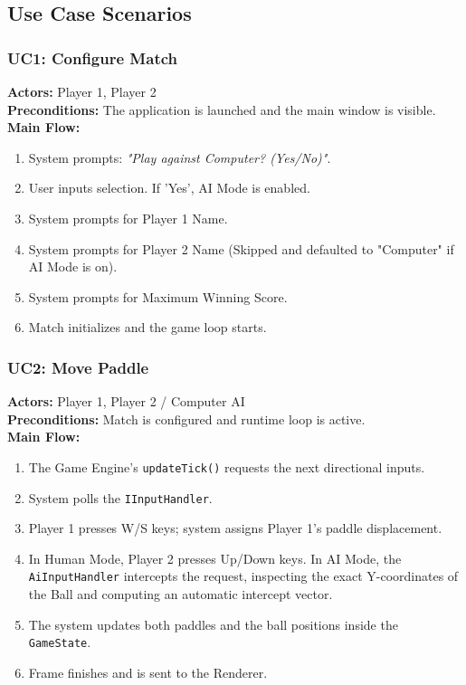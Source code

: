 \documentclass[12pt, a4paper]{article}
\begin{document}
\subsection{Use Case Scenarios}

\subsubsection*{UC1: Configure Match}
\textbf{Actors:} Player 1, Player 2 \\
\textbf{Preconditions:} The application is launched and the main window is visible. \\
\textbf{Main Flow:}
\begin{enumerate}
    \item System prompts: \textit{"Play against Computer? (Yes/No)"}.
    \item User inputs selection. If 'Yes', AI Mode is enabled.
    \item System prompts for Player 1 Name.
    \item System prompts for Player 2 Name (Skipped and defaulted to "Computer" if AI Mode is on).
    \item System prompts for Maximum Winning Score.
    \item Match initializes and the game loop starts.
\end{enumerate}

\subsubsection*{UC2: Move Paddle}
\textbf{Actors:} Player 1, Player 2 / Computer AI \\
\textbf{Preconditions:} Match is configured and runtime loop is active. \\
\textbf{Main Flow:}
\begin{enumerate}
    \item The Game Engine's \texttt{updateTick()} requests the next directional inputs.
    \item System polls the \texttt{IInputHandler}.
    \item Player 1 presses W/S keys; system assigns Player 1's paddle displacement.
    \item In Human Mode, Player 2 presses Up/Down keys. In AI Mode, the \texttt{AiInputHandler} intercepts the request, inspecting the exact Y-coordinates of the Ball and computing an automatic intercept vector.
    \item The system updates both paddles and the ball positions inside the \texttt{GameState}.
    \item Frame finishes and is sent to the Renderer.
\end{enumerate}
\end{document}
